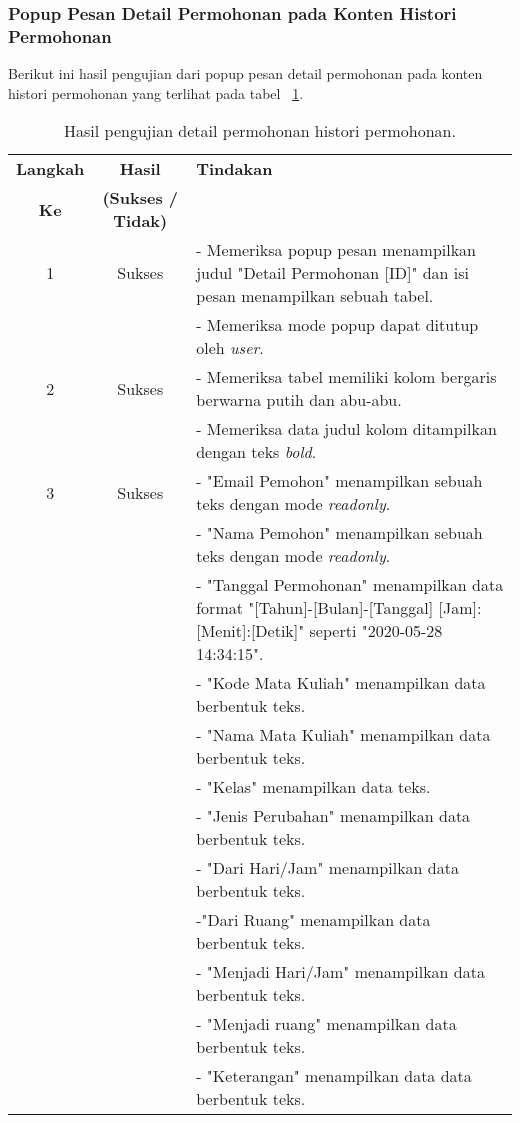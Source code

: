 \subsubsection{Popup Pesan Detail Permohonan pada Konten Histori Permohonan}
Berikut ini hasil pengujian dari popup pesan detail permohonan pada konten histori permohonan yang terlihat pada tabel ~\ref{hasil:DetailHistoriPermohonan}.
\begin{table}[H]
	\centering 
	\caption{Hasil pengujian detail permohonan histori permohonan.}
	\label{hasil:DetailHistoriPermohonan}
	\begin{tabular}{|c| c| p{}|}
		\toprule
		\textbf{Langkah} & \textbf{Hasil} & \textbf{Tindakan}\\
		\textbf{Ke} & \textbf{(Sukses / Tidak)} &\\
		\midrule
		1&Sukses& - Memeriksa popup pesan menampilkan judul "Detail Permohonan [ID]" dan isi pesan menampilkan sebuah tabel.\\
		&& - Memeriksa mode popup dapat ditutup oleh \textit{user}.\\
		\hline
		2&Sukses&- Memeriksa tabel memiliki kolom bergaris berwarna putih dan abu-abu.\\
		&& - Memeriksa data judul kolom ditampilkan dengan teks \textit{bold}.	\\	
		\hline
		3&Sukses&- "Email Pemohon" menampilkan sebuah teks dengan mode \textit{readonly}.\\
		&&- "Nama Pemohon" menampilkan sebuah teks dengan mode \textit{readonly}.\\
		&&- "Tanggal Permohonan" menampilkan data format "[Tahun]-[Bulan]-[Tanggal] [Jam]:[Menit]:[Detik]" seperti "2020-05-28 14:34:15".\\
		&&- "Kode Mata Kuliah" menampilkan data berbentuk teks.\\
		&&- "Nama Mata Kuliah" menampilkan data berbentuk teks.\\
		&&- "Kelas" menampilkan data teks.\\
		&&- "Jenis Perubahan" menampilkan data berbentuk teks.\\
		&&- "Dari Hari/Jam" menampilkan data berbentuk teks.\\
		&& -"Dari Ruang" menampilkan data berbentuk teks.\\
		&&- "Menjadi Hari/Jam" menampilkan data berbentuk teks.\\
		&&- "Menjadi ruang" menampilkan data berbentuk teks.\\
		&&- "Keterangan" menampilkan data data berbentuk teks.\\
		\bottomrule		
	\end{tabular} 
\end{table}

